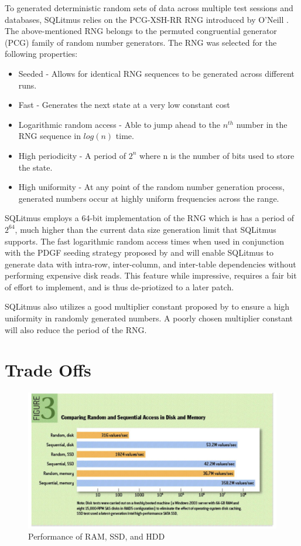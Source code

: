\documentclass[12pt]{report}
\begin{document}
\begin{spacing}{1.9}
		To generated deterministic random sets of data across multiple test sessions and databases, SQLitmus relies on the PCG-XSH-RR RNG introduced by O'Neill \cite{oneill:pcg2014}. The above-mentioned RNG belongs to the permuted congruential generator (PCG) family of random number generators. The RNG was selected for the following properties:
		\begin{itemize}
			\item Seeded - Allows for identical RNG sequences to be generated across different runs.
			\item Fast - Generates the next state at a very low constant cost
			\item Logarithmic random access - Able to jump ahead to the $n^{th}$ number in the RNG sequence in $log(n)$ time.
			\item High periodicity - A period of $2^n$ where n is the number of bits used to store the state.
			\item High uniformity - At any point of the random number generation process, generated numbers occur at highly uniform frequencies across the range.
		\end{itemize}
		
		
		SQLitmus employs a 64-bit implementation of the RNG which is has a period of $2^{64}$, much higher than the current data size generation limit that SQLitmus supports. The fast logarithmic random access times when used in conjunction with the PDGF seeding strategy proposed by \cite{Rabl:2010} and \cite{Alexandrov:2012} will enable SQLitmus to generate data with intra-row, inter-column, and inter-table dependencies without performing expensive disk reads. This feature while impressive, requires a fair bit of effort to implement, and is thus de-priotized to a later patch.
		
		SQLitmus also utilizes a good multiplier constant proposed by \cite{L'Ecuyer:1999} to ensure a high uniformity in randomly generated numbers. A poorly chosen multiplier constant will also reduce the period of the RNG. 
		
		
		\section{Trade Offs}
		
		\begin{figure}[H]
			\centering
			\includegraphics[width=\textwidth]{2-3-4.png}
			\caption{Performance of RAM, SSD, and HDD \cite{Jacobs:2009}}
			

\end{figure}
\end{spacing}
\end{document}
